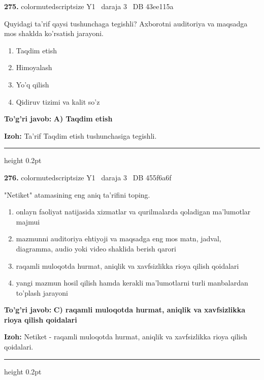 \documentclass[10pt,a4paper,oneside]{article}
\begin{document}
\noindent\textbf{\color{ink}275.}  {color{muted}scriptsize Y1 \textbullet\ daraja 3 \textbullet\ DB 43ee115a}
\par
Quyidagi ta'rif qaysi tushunchaga tegishli? Axborotni auditoriya va maqsadga mos shaklda ko'rsatish jarayoni.
\begin{enumerate}[label=\Alph*),leftmargin=9mm]
\item Taqdim etish
\item Himoyalash
\item Yo'q qilish
\item Qidiruv tizimi va kalit so'z
\end{enumerate}
\begin{tcolorbox}[enhanced,breakable,colback=teal!4,colframe=teal!50!black,boxrule=0.5pt,arc=1.1mm,left=3mm,right=3mm,top=1.7mm,bottom=1.7mm,before skip=2mm,after skip=2mm]
\textbf{\color{teal}To'g'ri javob:} \textbf{A) Taqdim etish}
\par\smallskip
\textbf{Izoh:} Ta'rif Taqdim etish tushunchasiga tegishli.
\end{tcolorbox}
\vspace{2mm}\hrule height 0.2pt \vspace{3mm}

\noindent\textbf{\color{ink}276.}  {color{muted}scriptsize Y1 \textbullet\ daraja 3 \textbullet\ DB 455f6a6f}
\par
"Netiket" atamasining eng aniq ta'rifini toping.
\begin{enumerate}[label=\Alph*),leftmargin=9mm]
\item onlayn faoliyat natijasida xizmatlar va qurilmalarda qoladigan ma'lumotlar majmui
\item mazmunni auditoriya ehtiyoji va maqsadga eng mos matn, jadval, diagramma, audio yoki video shaklida berish qarori
\item raqamli muloqotda hurmat, aniqlik va xavfsizlikka rioya qilish qoidalari
\item yangi mazmun hosil qilish hamda kerakli ma'lumotlarni turli manbalardan to'plash jarayoni
\end{enumerate}
\begin{tcolorbox}[enhanced,breakable,colback=teal!4,colframe=teal!50!black,boxrule=0.5pt,arc=1.1mm,left=3mm,right=3mm,top=1.7mm,bottom=1.7mm,before skip=2mm,after skip=2mm]
\textbf{\color{teal}To'g'ri javob:} \textbf{C) raqamli muloqotda hurmat, aniqlik va xavfsizlikka rioya qilish qoidalari}
\par\smallskip
\textbf{Izoh:} Netiket - raqamli muloqotda hurmat, aniqlik va xavfsizlikka rioya qilish qoidalari.
\end{tcolorbox}
\vspace{2mm}\hrule height 0.2pt \vspace{3mm}
\end{document}
